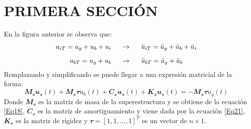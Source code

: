 \section{PRIMERA SECCIÓN}

En la figura anterior se observa que:
\begin{subequations}\label{Cap3_Eq1}
\begin{gather}
u_{iT}=u_{g}+u_{b}+u_{i} \hspace{5mm} \rightarrow \hspace{5mm} \ddot{u}_{iT}=\ddot{u}_{g}+\ddot{u}_{b}+\ddot{u}_{i}		\label{Cap3_Eq1_1} \\[2 mm]
u_{bT}=u_{g}+u_{b}\hspace{5mm} \rightarrow \hspace{5mm} \ddot{u}_{bT}=\ddot{u}_{g}+\ddot{u}_{b} \label{Cap3_Eq1_2}
\end{gather}
\end{subequations}
Remplazando y simplificando se puede llegar a una expresión matricial de la forma: 
\begin{equation}\label{Cap3_Eq3}
\mathbfit{M_{s}\ddot{u}_{s}}(t)+\mathbfit{M_{s}\tau}\ddot{u}_{b}(t)+\mathbfit{C_{s}\dot{u}_{s}}(t)+\mathbfit{K_{s}u_{s}}(t)=-\mathbfit{M_{s}\tau}\ddot{u}_{g}(t)
\end{equation}
Donde $\mathbfit{M_{s}}$ es la matriz de masa de la superestructura y se obtiene de la ecuación \ref{Eq18}, $\mathbfit{C_{s}}$ es la matriz de amortiguamiento y viene dada por la ecuación \ref{Eq21}, $\mathbfit{K_{s}}$ es la matriz de rigidez y $\mathbfit{\tau}=\left[1, 1,\ldots,1\right]^{T}$ es un vector de $n\times 1$.

